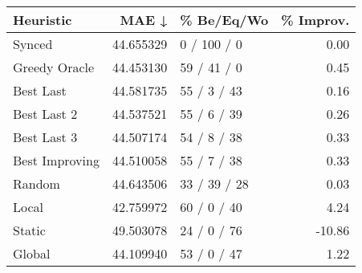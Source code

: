 \begin{tabular}{lrlr}
\toprule
      Heuristic &      MAE ↓ &    \% Be/Eq/Wo & \% Improv. \\
\midrule
         Synced &  44.655329 &   0 / 100 / 0 &      0.00 \\
  Greedy Oracle &  44.453130 &   59 / 41 / 0 &      0.45 \\
      Best Last &  44.581735 &   55 / 3 / 43 &      0.16 \\
    Best Last 2 &  44.537521 &   55 / 6 / 39 &      0.26 \\
    Best Last 3 &  44.507174 &   54 / 8 / 38 &      0.33 \\
 Best Improving &  44.510058 &   55 / 7 / 38 &      0.33 \\
         Random &  44.643506 &  33 / 39 / 28 &      0.03 \\
          Local &  42.759972 &   60 / 0 / 40 &      4.24 \\
         Static &  49.503078 &   24 / 0 / 76 &    -10.86 \\
         Global &  44.109940 &   53 / 0 / 47 &      1.22 \\
\bottomrule
\end{tabular}

\label{tab:non_lr005_le1_bs2_Summary}
